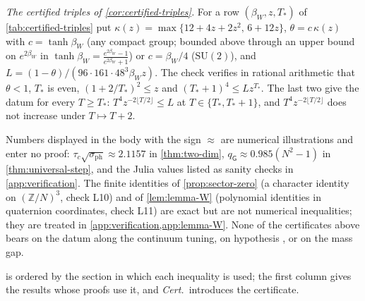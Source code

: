 \documentclass[11pt,a4paper]{amsart}
\theoremstyle{definition}
\theoremstyle{remark}
\numberwithin{equation}{section}
\newcommand{\Z}{\mathbb{Z}}          %
\newcommand{\SU}{\mathrm{SU}}              %
\newcommand{\Gharm}{\mathsf{G}}            %
\newcommand{\Mcirc}{\text{\upshape(M$^{\circ}$)}}   %
\newcommand{\hypW}{\text{\upshape(W)}}              %
\newcommand{\betaW}{\beta_{W}}             %
\begin{document}
\emph{The certified triples of \cref{cor:certified-triples}.} For a row $(\betaW,z,T_*)$ of \cref{tab:certified-triples} put $\kappa(z)=\max\{12+4z+2z^2,\,6+12z\}$, $\theta=c\,\kappa(z)$ with $c=\tanh\betaW$ (any compact group; bounded above through an upper bound on $e^{2\betaW}$ in $\tanh\betaW=\frac{e^{2\betaW}-1}{e^{2\betaW}+1}$) or $c=\betaW/4$ ($\SU(2)$), and $L=(1-\theta)/(96\cdot161\cdot48^3\betaW z)$. The check verifies in rational arithmetic that $\theta<1$, $T_*$ is even, $(1+2/T_*)^2\le z$ and $(T_*+1)^4\le Lz^{T_*}$. The last two give the datum for every $T\ge T_*$: $T^4z^{-2\lfloor T/2\rfloor}\le L$ at $T\in\{T_*,T_*+1\}$, and $T^4z^{-2\lfloor T/2\rfloor}$ does not increase under $T\mapsto T+2$.

Numbers displayed in the body with the sign $\approx$ are numerical illustrations and enter no proof: $\tau_c\sqrt{\sigma_{\mathrm{ph}}}\approx2.1157$ in \cref{thm:two-dim}, $q_{\Gharm}\approx0.985(N^2-1)$ in \cref{thm:universal-step}, and the Julia values listed as sanity checks in \cref{app:verification}. The finite identities of \cref{prop:sector-zero} (a character identity on $(\Z/N)^3$, check L10) and of \cref{lem:lemma-W} (polynomial identities in quaternion coordinates, check L11) are exact but are not numerical inequalities; they are treated in \cref{app:verification,app:lemma-W}. None of the certificates above bears on the datum \Mcirc{} along the continuum tuning, on hypothesis \hypW, or on the mass gap.

 is ordered by the section in which each inequality is used; the first column gives the results whose proofs use it, and \emph{Cert.}\ introduces the certificate.
\end{document}

